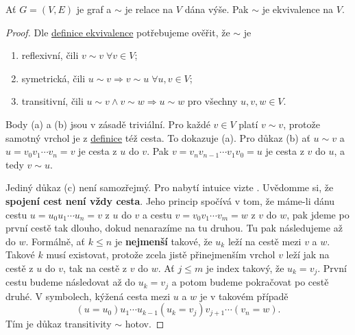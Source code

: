 \begin{lemma}
 \label{lem:cesta-ekvivalence}
 Ať $G = (V,E)$ je graf a $ \sim $ je relace na $V$ dána výše. Pak $ \sim $ je
 ekvivalence na $V$.
\end{lemma}
\begin{proof}
 Dle \hyperref[def:ekvivalence]{definice ekvivalence} potřebujeme ověřit, že $
 \sim $ je
 \begin{enumerate}[label=(\alph*)]
  \item reflexivní, čili $v \sim v \; \forall v \in V$;
  \item symetrická, čili $u \sim v \Rightarrow v \sim u \; \forall u,v \in
   V$;
  \item transitivní, čili $u \sim v \wedge v \sim w \Rightarrow u \sim w$ pro
   všechny $u,v,w \in V$.
 \end{enumerate}
 Body (a) a (b) jsou v zásadě triviální. Pro každé $v \in V$ platí $v \sim v$,
 protože samotný vrchol je z \hyperref[def:cesta]{definice} též cesta. To
 dokazuje (a). Pro důkaz (b) ať $u \sim v$ a $u=v_0v_1\cdots v_n=v$ je cesta z
 $u$ do $v$. Pak $v=v_nv_{n-1}\cdots v_1v_0=u$ je cesta z $v$ do $u$, a tedy
 $v \sim u$.

 Jediný důkaz (c) není samozřejmý. Pro nabytí intuice vizte
 . Uvědomme si, že \textbf{spojení cest
 není vždy cesta}. Jeho princip spočívá v tom, že máme-li dánu cestu
 $u=u_0u_1\cdots u_n=v$ z $u$ do $v$ a cestu $v=v_0v_1\cdots v_m=w$ z $v$ do
 $w$, pak jdeme po první cestě tak dlouho, dokud nenarazíme na tu druhou. Tu pak
 následujeme až do $w$. Formálně, ať $k \leq n$ je \textbf{nejmenší} takové, že
 $u_k$ leží na cestě mezi $v$ a $w$. Takové $k$ musí existovat, protože zcela
 jistě přinejmenším vrchol $v$ leží jak na cestě z $u$ do $v$, tak na cestě z
 $v$ do $w$. Ať $j \leq m$ je index takový, že $u_k = v_j$. První cestu budeme
 následovat až do $u_k = v_j$ a potom budeme pokračovat po cestě druhé. V
 symbolech, kýžená cesta mezi $u$ a $w$ je v takovém případě
 \[
  (u=u_0)u_1\cdots u_{k-1}(u_k=v_j)v_{j+1}\cdots (v_n=w).
 \]
 Tím je důkaz transitivity $ \sim $ hotov.
\end{proof}

